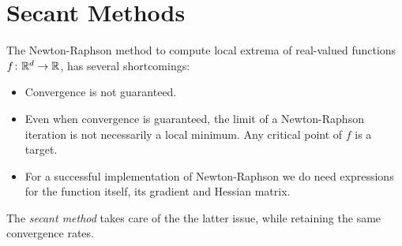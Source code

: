 \section{Secant Methods}
The Newton-Raphson method to compute local extrema of real-valued functions $f \colon \mathbb{R}^d \to \mathbb{R}$, has several shortcomings: 
\begin{itemize}
	\item Convergence is not guaranteed.
	\item Even when convergence is guaranteed, the limit of a Newton-Raphson iteration is not necessarily a local minimum.  Any critical point of $f$ is a target.
	\item For a successful implementation of Newton-Raphson we do need expressions for the function itself, its gradient and Hessian matrix.  
\end{itemize}
The \emph{secant method} takes care of the the latter issue, while retaining the same convergence rates.

